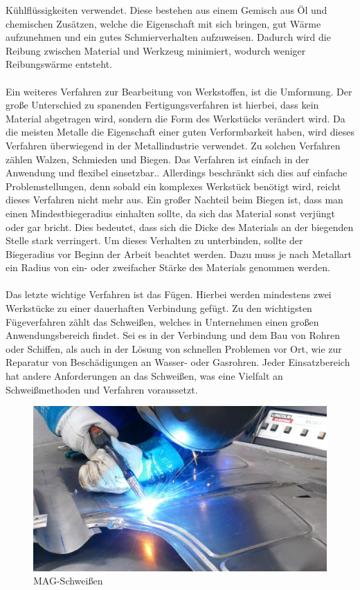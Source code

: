 Kühlflüssigkeiten verwendet. Diese bestehen aus einem Gemisch aus Öl und chemischen Zusätzen, welche die Eigenschaft mit sich bringen, gut Wärme 
aufzunehmen und ein gutes Schmierverhalten aufzuweisen. Dadurch wird die Reibung zwischen Material und Werkzeug minimiert, wodurch weniger Reibungswärme
entsteht. \autocite{Dietrich.2020} 
\\\\
Ein weiteres Verfahren zur Bearbeitung von Werkstoffen, ist die Umformung. Der große Unterschied zu spanenden Fertigungsverfahren ist hierbei, dass kein 
Material abgetragen wird, sondern die Form des Werkstücks verändert wird. Da die meisten Metalle die Eigenschaft einer guten Verformbarkeit haben, wird 
dieses Verfahren überwiegend in der Metallindustrie verwendet. Zu solchen Verfahren zählen \zB Walzen, Schmieden und Biegen. Das Verfahren ist einfach in der Anwendung und 
flexibel einsetzbar.. Allerdings beschränkt sich dies auf einfache Problemstellungen, denn sobald ein komplexes Werkstück benötigt wird, reicht 
dieses Verfahren nicht mehr aus. Ein großer Nachteil beim Biegen ist, dass man einen Mindestbiegeradius einhalten sollte, da sich das Material sonst verjüngt 
oder gar bricht. Dies bedeutet, dass sich die Dicke des Materials an der biegenden Stelle stark verringert. 
Um dieses Verhalten zu unterbinden, sollte der Biegeradius vor Beginn der Arbeit beachtet werden. Dazu muss je nach Metallart ein Radius von ein- oder zweifacher
Stärke des Materials genommen werden. \autocite{Arendes.2023}
\\\\
Das letzte wichtige Verfahren ist das Fügen. Hierbei werden mindestens zwei Werkstücke zu einer dauerhaften Verbindung gefügt. Zu den wichtigsten 
Fügeverfahren zählt das Schweißen, welches in Unternehmen einen großen Anwendungsbereich findet. Sei es in der Verbindung und dem Bau von Rohren oder 
Schiffen, als auch in der Lösung von schnellen Problemen vor Ort, wie \zB zur Reparatur von Beschädigungen an Wasser- oder Gasrohren. Jeder Einsatzbereich 
hat andere Anforderungen an das Schweißen, was eine Vielfalt an Schweißmethoden und Verfahren voraussetzt. 
\begin{figure}[hbt]
    \centering
    \includegraphics[width=0.98\linewidth]{images/MAG}
    \caption[MAG-Schweißen]{MAG-Schweißen \autocite{MAG}}
    \label{fig:MAG-Schweißen}
\end{figure}
